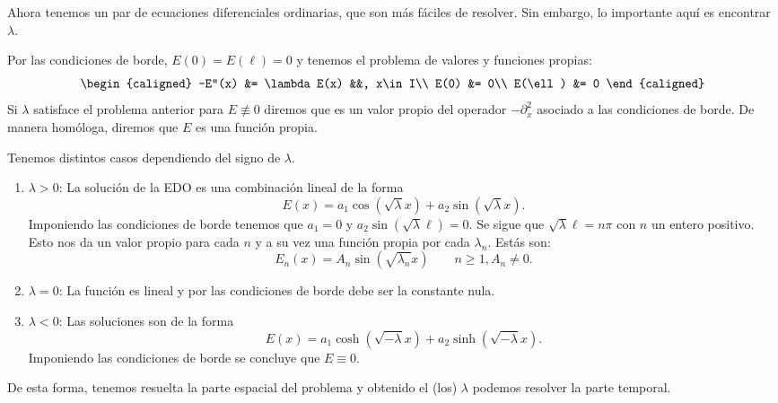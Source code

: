 \documentclass[../edp.tex]{subfiles}
\begin{document}
Ahora tenemos un par de ecuaciones diferenciales ordinarias, que son
más fáciles de resolver. Sin embargo, lo importante aquí es encontrar
\(\lambda\).

Por las condiciones de borde, \(E(0) = E(\ell) = 0\) y tenemos el
problema de valores y funciones propias:
\begin{displaymath}
\begin{caligned}
	-E''(x) &= \lambda E(x) &&, x\in I\\
	E(0) &= 0\\
	E(\ell) &= 0
\end{caligned}
\end{displaymath}
Si \(\lambda\) satisface el problema anterior para \(E\not\equiv 0\)
diremos que es un valor propio del operador \(-\partial_{x}^2\)
asociado a las condiciones de borde. De manera homóloga, diremos que
\(E\) es una función propia.

Tenemos distintos casos dependiendo del signo de \(\lambda\).
\begin{enumerate}
	\item \(\lambda > 0\): La solución de la EDO es una combinación
		lineal de la forma
		\begin{displaymath}
			E(x)
			=
			a_1 \cos(\sqrt{\lambda} x) 
			+
			a_2 \sin(\sqrt{\lambda} x).
		\end{displaymath}
		Imponiendo las condiciones de borde tenemos que \(a_1 = 0\) y
		\(a_2 \sin(\sqrt{\lambda} \ell) = 0\). Se sigue que
		\(\sqrt{\lambda} \ell = n \pi\) con \(n\) un entero positivo.
		Esto nos da un valor propio para cada \(n\) y a su vez una
		función propia por cada \(\lambda_{n}\). Estás son:
		\begin{displaymath}
			E_{n}(x)
			=
			A_n \sin(\sqrt{\lambda_{n}} x)
			\qquad
			n \ge 1,
			A_n \ne 0.
		\end{displaymath}
	\item \(\lambda = 0\): La función es lineal y por las condiciones
		de borde debe ser la constante nula.
	\item \(\lambda < 0\): Las soluciones son de la forma
		\begin{displaymath}
			E(x)
			=
			a_1 \cosh(\sqrt{-\lambda} x)
			+
			a_2 \sinh(\sqrt{-\lambda} x).
		\end{displaymath}
		Imponiendo las condiciones de borde se concluye que \(E \equiv
		0\).
\end{enumerate}

De esta forma, tenemos resuelta la parte espacial del problema y
obtenido el (los) \(\lambda\) podemos resolver la parte temporal.
\end{document}
